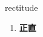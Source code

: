 
\begin{frame}
{\huge rectitude}
\begin{center}
\begin{enumerate}\Large
  \item \textbf{正直}
\end{enumerate}
\end{center}
\end{frame}

